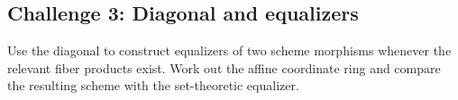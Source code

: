 \subsection*{Challenge 3: Diagonal and equalizers}
\begin{problem}\label{chal:vi23-03}
Use the diagonal to construct equalizers of two scheme morphisms whenever the relevant fiber products exist. Work out the affine coordinate ring and compare the resulting scheme with the set-theoretic equalizer.
\end{problem}
